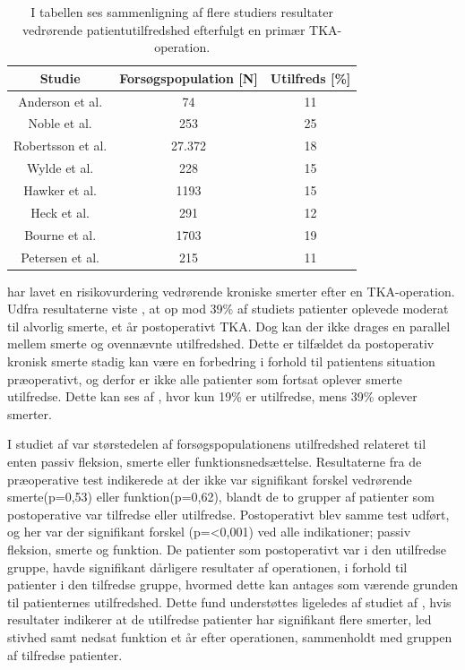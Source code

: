 \begin{table}[H]
	\centering
\begin{tabular}{ccc}
	\hline
	\rowcolor[HTML]{C0C0C0} 
	Studie            & Forsøgspopulation {[}N{]} & Utilfreds {[}\%{]} \\ \hline
	Anderson et al.   & 74                        & 11                 \\
	Noble et al.      & 253                       & 25                 \\
	Robertsson et al. & 27.372                    & 18                 \\
	Wylde et al.      & 228                       & 15                 \\
	Hawker et al.     & 1193                      & 15                 \\
	Heck et al.       & 291                       & 12                 \\
	Bourne et al.     & 1703                      & 19                 \\
	Petersen et al.	  & 215						  & 11				   \\ \hline
\end{tabular}
	\caption{I tabellen ses \cite{Bourne2010} sammenligning af flere studiers resultater vedrørende patientutilfredshed efterfulgt en primær TKA-operation. \citep{Bourne2010}\citep{Petersen2015}}
	\label{tab:patient_utilfreds}
\end{table}

\cite{Sakellariou2016} har lavet en risikovurdering vedrørende kroniske smerter efter en TKA-operation. Udfra resultaterne viste \cite{Sakellariou2016}, at op mod 39\% af studiets patienter oplevede moderat til alvorlig smerte, et år postoperativt TKA. Dog kan der ikke drages en parallel mellem smerte og ovennævnte utilfredshed. Dette er tilfældet da postoperativ kronisk smerte stadig kan være en forbedring i forhold til patientens situation præoperativt, og derfor er ikke alle patienter som fortsat oplever smerte utilfredse. Dette kan ses af \citep{skallariou2016}, hvor kun 19\% er utilfredse, mens 39\% oplever smerter.\citep{Sakellariou2016} 

I studiet af \cite{Jacobs2014} var størstedelen af forsøgspopulationens utilfredshed relateret til enten passiv fleksion, smerte eller funktionsnedsættelse. Resultaterne fra de præoperative test indikerede at der ikke var signifikant forskel vedrørende smerte(p=0,53) eller funktion(p=0,62), blandt de to grupper af patienter som postoperative var tilfredse eller utilfredse. Postoperativt blev samme test udført, og her var der signifikant forskel (p=<0,001) ved alle indikationer; passiv fleksion, smerte og funktion. 
De patienter som postoperativt var i den utilfredse gruppe, havde signifikant dårligere resultater af operationen, i forhold til patienter i den tilfredse gruppe, hvormed dette kan antages som værende grunden til patienternes utilfredshed. \citep{Jacobs2014} 
Dette fund understøttes ligeledes af studiet af \cite{Bourne2010}, hvis resultater indikerer at de utilfredse patienter har signifikant flere smerter, led stivhed samt nedsat funktion et år efter operationen, sammenholdt med gruppen af tilfredse patienter. \citep{Bourne2010}


